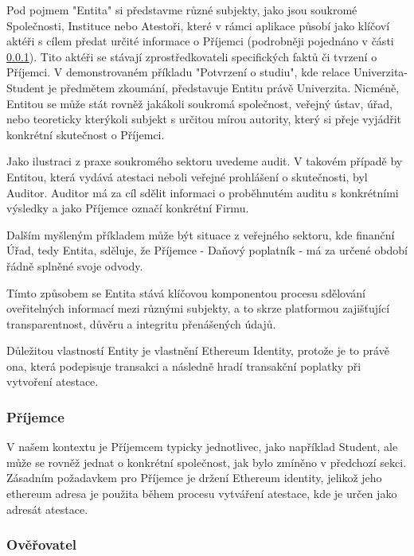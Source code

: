 Pod pojmem "Entita" si představme různé subjekty, jako jsou soukromé Společnosti, Instituce nebo Atestoři, které v rámci aplikace působí jako klíčoví aktéři s cílem předat určité informace o Příjemci (podrobněji pojednáno v části \ref{subsubsec:User}). Tito aktéři se stávají zprostředkovateli specifických faktů či tvrzení o Příjemci. V demonstrovaném příkladu "Potvrzení o studiu", kde relace Univerzita-Student je předmětem zkoumání, představuje Entitu právě Univerzita. Nicméně, Entitou se může stát rovněž jakákoli soukromá společnost, veřejný ústav, úřad, nebo teoreticky kterýkoli subjekt s určitou mírou autority, který si přeje vyjádřit konkrétní skutečnost o Příjemci.

Jako ilustraci z praxe soukromého sektoru uvedeme audit. V takovém případě by Entitou, která vydává atestaci neboli veřejné prohlášení o skutečnosti, byl Auditor. Auditor má za cíl sdělit informaci o proběhnutém auditu s konkrétními výsledky a jako Příjemce označí konkrétní Firmu.

Dalším myšleným příkladem může být situace z veřejného sektoru, kde finanční Úřad, tedy Entita, sděluje, že Příjemce - Daňový poplatník - má za určené období řádně splněné svoje odvody.

Tímto způsobem se Entita stává klíčovou komponentou procesu sdělování oveřitelných informací mezi různými subjekty, a to skrze platformou zajišťující transparentnost, důvěru a integritu přenášených údajů.

Důležitou vlastností Entity je vlastnění Ethereum Identity, protože je to právě ona, která podepisuje transakci a následně hradí transakční poplatky při vytvoření atestace.

\subsubsection{Příjemce}\label{subsubsec:User}

V našem kontextu je Příjemcem typicky jednotlivec, jako například Student, ale může se rovněž jednat o konkrétní společnost, jak bylo zmíněno v předchozí sekci. Zásadním požadavkem pro Příjemce je držení Ethereum identity, jelikož jeho ethereum adresa je použita během procesu vytváření atestace, kde je určen jako adresát atestace.




\subsubsection{Ověřovatel}

